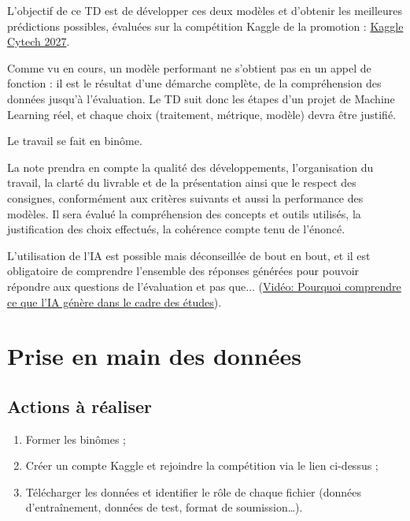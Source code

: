 \documentclass[a4paper,11pt]{article}
\begin{document}
	L'objectif de ce TD est de développer ces deux modèles et d'obtenir les meilleures prédictions possibles, évaluées sur la compétition Kaggle de la promotion : \href{https://www.kaggle.com/t/525fcbbbe8dc48a18005e47f00ae34da/}{Kaggle Cytech 2027}.
	
	Comme vu en cours, un modèle performant ne s'obtient pas en un appel de fonction : il est le résultat d'une démarche complète, de la compréhension des données jusqu'à l'évaluation. Le TD suit donc les étapes d'un projet de Machine Learning réel, et chaque choix (traitement, métrique, modèle) devra être justifié.
	
	Le travail se fait en binôme.
	
	La note prendra en compte la qualité des développements, l’organisation du travail, la clarté du livrable et de la présentation ainsi que le respect des consignes, conformément aux critères suivants et aussi la performance des modèles. Il sera évalué la compréhension des concepts et outils utilisés, la justification des choix effectués, la cohérence compte tenu de l'énoncé. 
	
	L'utilisation de l'IA est possible mais déconseillée de bout en bout, et il est obligatoire de comprendre l'ensemble des réponses générées pour pouvoir répondre aux questions de l'évaluation et pas que... (\href{https://www.youtube.com/watch?v=4xq6bVbS-Pw}{Vidéo: Pourquoi comprendre ce que l'IA génère dans le cadre des études}). 
	
	\section{Prise en main des données}
	
	\subsection*{Actions à réaliser}
	\begin{enumerate}
		\item Former les binômes ;
		\item Créer un compte Kaggle et rejoindre la compétition via le lien ci-dessus ;
		\item Télécharger les données et identifier le rôle de chaque fichier (données d'entraînement, données de test, format de soumission\dots).
	\end{enumerate}
	
\end{document}
